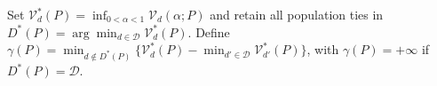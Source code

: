 Set \(\mathcal V_d^*(P)=\inf_{0<\alpha<1}\mathcal V_d(\alpha;P)\) and retain all population ties in \(D^*(P)=\arg\min_{d\in\mathcal D}\mathcal V_d^*(P)\). Define \(\gamma(P)=\min_{d\notin D^*(P)}\{\mathcal V_d^*(P)-\min_{d'\in\mathcal D}\mathcal V_{d'}^*(P)\}\), with \(\gamma(P)=+\infty\) if \(D^*(P)=\mathcal D\).